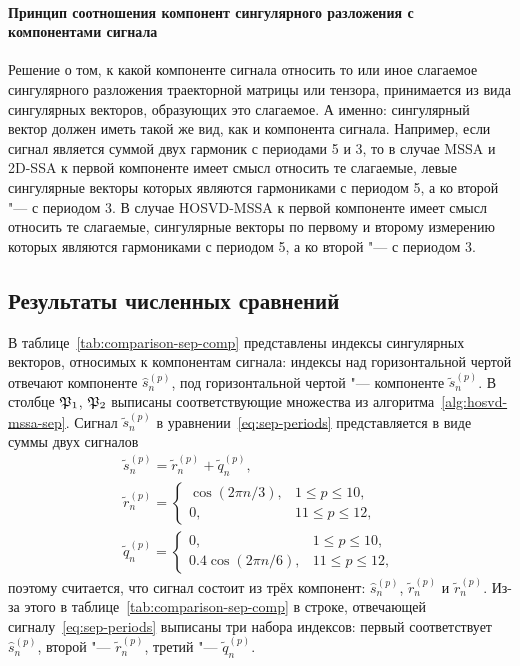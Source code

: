 \documentclass[specialist,
    substylefile = spbu_report.rtx,
    subf,href,colorlinks=true, 12pt]{disser}
\theoremstyle{plain}
\theoremstyle{definition}
\theoremstyle{remark}
\begin{document}
    \paragraph{Принцип соотношения компонент сингулярного разложения с компонентами сигнала}
    \label{par:example-components-sep}
    Решение о том, к какой компоненте сигнала относить то или иное слагаемое сингулярного разложения 
    траекторной матрицы или тензора, принимается из вида сингулярных векторов, образующих это слагаемое.
    А именно: сингулярный вектор должен иметь такой же вид, как и компонента сигнала.
    Например, если сигнал является суммой двух гармоник с периодами 5 и 3, то в случае MSSA и 2D-SSA
    к первой компоненте имеет смысл относить те слагаемые, левые сингулярные векторы которых являются гармониками
    с периодом 5, а ко второй "--- с периодом 3. 
    В случае HOSVD-MSSA к первой компоненте имеет смысл относить те слагаемые, сингулярные векторы по первому и
    второму измерению которых являются гармониками с периодом 5, а ко второй "--- с периодом 3.
    
    
    \subsection{Результаты численных сравнений}\label{subsec:numerical-comp-sep}
    В таблице~\ref{tab:comparison-sep-comp} представлены индексы сингулярных векторов, относимых
    к компонентам сигнала: индексы над горизонтальной чертой отвечают компоненте $\hat{s}_n^{(p)}$,
    под горизонтальной чертой "--- компоненте $\tilde{s}_n^{(p)}$.
    В столбце $\mathfrak{P}_1$, $\mathfrak{P}_2$ выписаны соответствующие множества из алгоритма~\ref{alg:hosvd-mssa-sep}.
    Сигнал $\tilde{s}_n^{(p)}$ в уравнении~\eqref{eq:sep-periods} представляется в виде суммы двух сигналов
    \begin{gather*}
        \tilde{s}_n^{(p)} = \tilde{r}_n^{(p)} + \tilde{q}_n^{(p)},\\
        \tilde{r}_n^{(p)} = \begin{cases}
            \cos(2\pi n /3), & 1 \leqslant p \leqslant 10,\\
            0, & 11 \leqslant p \leqslant 12,
        \end{cases} \\
        \tilde{q}_n^{(p)} = \begin{cases}
            0, & 1 \leqslant p \leqslant 10,\\
            0.4 \cos(2 \pi n / 6), & 11 \leqslant p \leqslant 12,
        \end{cases}
    \end{gather*}
    поэтому считается, что сигнал состоит из трёх компонент: $\hat{s}_n^{(p)}$, $\tilde{r}_n^{(p)}$ и 
    $\tilde{r}_n^{(p)}$.
    Из-за этого в таблице~\ref{tab:comparison-sep-comp} в строке, отвечающей сигналу~\ref{eq:sep-periods} выписаны
    три набора индексов: первый соответствует $\hat{s}_n^{(p)}$, второй "--- $\tilde{r}_n^{(p)}$, 
    третий "--- $\tilde{q}_n^{(p)}$.
    
\end{document}
